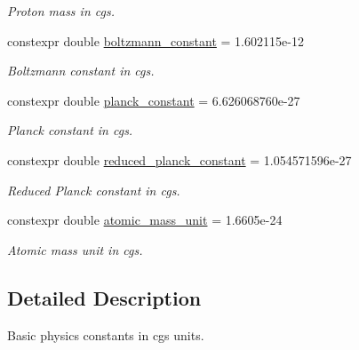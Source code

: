 \begin{DoxyCompactItemize}
\begin{DoxyCompactList}\small\item\em Proton mass in cgs. \end{DoxyCompactList}\item 
\mbox{\label{namespaceraytracer_1_1constants_ac2c1dccc26c3700a9b934e11245ee79f}} 
constexpr double \hyperlink{namespaceraytracer_1_1constants_ac2c1dccc26c3700a9b934e11245ee79f}{boltzmann\+\_\+constant} = 1.\+602115e-\/12
\begin{DoxyCompactList}\small\item\em Boltzmann constant in cgs. \end{DoxyCompactList}\item 
\mbox{\label{namespaceraytracer_1_1constants_a57166090154a8f6df45d2f6dd3fbb3b9}} 
constexpr double \hyperlink{namespaceraytracer_1_1constants_a57166090154a8f6df45d2f6dd3fbb3b9}{planck\+\_\+constant} = 6.\+626068760e-\/27
\begin{DoxyCompactList}\small\item\em Planck constant in cgs. \end{DoxyCompactList}\item 
\mbox{\label{namespaceraytracer_1_1constants_a3bc79d50e2cd8d00e0a699fe06f6a52e}} 
constexpr double \hyperlink{namespaceraytracer_1_1constants_a3bc79d50e2cd8d00e0a699fe06f6a52e}{reduced\+\_\+planck\+\_\+constant} = 1.\+054571596e-\/27
\begin{DoxyCompactList}\small\item\em Reduced Planck constant in cgs. \end{DoxyCompactList}\item 
\mbox{\label{namespaceraytracer_1_1constants_a93db781cf79ad352e206eaf666719fbd}} 
constexpr double \hyperlink{namespaceraytracer_1_1constants_a93db781cf79ad352e206eaf666719fbd}{atomic\+\_\+mass\+\_\+unit} = 1.\+6605e-\/24
\begin{DoxyCompactList}\small\item\em Atomic mass unit in cgs. \end{DoxyCompactList}\end{DoxyCompactItemize}


\subsection{Detailed Description}
Basic physics constants in cgs units. 